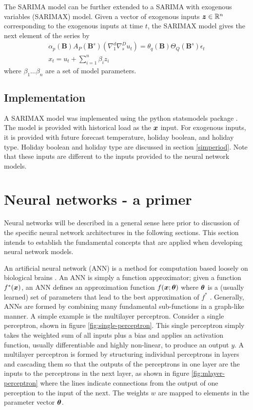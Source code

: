The SARIMA model can be further extended to a SARIMA with exogenous variables (SARIMAX) model.
Given a vector of exogenous inputs ${\bm{z}} \in \mathbb{R}^{n}$ corresponding to the exogenous inputs at time $t$, the SARIMAX model gives the next element of the series by
\begin{gather}	
\alpha_{p}(\textbf{B})A_{P}(\textbf{B}^{s})(\nabla_{1}^{d}\nabla_{s}^{D}u_{t}) = \theta_{q}(\textbf{B})\Theta_{Q}(\textbf{B}^{s})\epsilon_{t} \\	
x_{t} = u_{t} + \sum_{i=1}^{n}\beta_{i}z_{i}
\end{gather}
where $\beta_{1} \ldots \beta_{n}$ are a set of model parameters.

\subsection{Implementation}
A SARIMAX model was implemented using the python statsmodels package \cite{statsmodels}.
The model is provided with historical load as the ${\bm{x}}$ input.
For exogenous inputs, it is provided with future forecast temperature, holiday boolean, and holiday type.
Holiday boolean and holiday type are discussed in section \ref{simperiod}.
Note that these inputs are different to the inputs provided to the neural network models.


\section{Neural networks - a primer}
Neural networks will be described in a general sense here prior to discussion of the specific neural network architectures in the following sections.
This section intends to establish the fundamental concepts that are applied when developing neural network models.

An artificial neural network (ANN) is a method for computation based loosely on biological brains \citep{negnevitsky2005artificial}.
An ANN is simply a function approximator; given a function $f^*({\bm{x}})$, an ANN defines an approximation function $f({\bm{x}}; {\bm{\theta}})$ where ${\bm{\theta}}$ is a (usually learned) set of parameters that lead to the best approximation of $f^*$ \citep{Goodfellow-et-al-2016}. 
Generally, ANNs are formed by combining many fundamental sub-functions in a graph-like manner. 
A simple example is the multilayer perceptron.
Consider a single perceptron, shown in figure \ref{fig:single-perceptron}.
This single perceptron simply takes the weighted sum of all inputs plus a bias and applies an activation function, usually differentiable and highly non-linear, to produce an output $y$.
A multilayer perceptron is formed by structuring individual perceptrons in layers and cascading them so that the outputs of the perceptrons in one layer are the inputs to the perceptrons in the next layer, as shown in figure \ref{fig:mlayer-perceptron} where the lines indicate connections from the output of one perception to the input of the next.
The weights $w$ are mapped to elements in the parameter vector ${\bm{\theta}}$.


